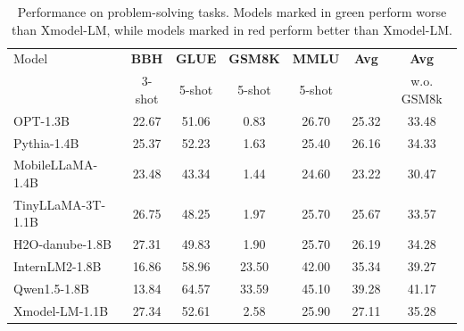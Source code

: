 \documentclass{article}
\newcommand{\llm}{Xmodel-LM\xspace}
\begin{document}
\begin{table}[ht]
  \centering
  \setlength{\tabcolsep}{8pt}
  \begin{tabular}{lcccccc}
    \toprule
    Model & \textbf{BBH} & \textbf{GLUE} & \textbf{GSM8K} & \textbf{MMLU} & \textbf{Avg} & \textbf{Avg}\\
    & 3-shot& 5-shot& 5-shot& 5-shot&&w.o. GSM8k \\
    \midrule
    \rowcolor{darkgreen!20}
    OPT-1.3B\xspace   &22.67&51.06&0.83&26.70&25.32&33.48 \\
    \rowcolor{darkgreen!20}
    Pythia-1.4B\xspace   &25.37&52.23&1.63&25.40&26.16&34.33 \\
    \rowcolor{darkgreen!20}
    MobileLLaMA-1.4B\xspace   &23.48&43.34&1.44&24.60&23.22&30.47 \\
    \rowcolor{darkgreen!20}
    TinyLLaMA-3T-1.1B\xspace   &26.75&48.25&1.97&25.70&25.67&33.57 \\
    \rowcolor{darkgreen!20}
    H2O-danube-1.8B\xspace  &27.31&49.83&1.90&25.70&26.19&34.28 \\
    \rowcolor{darkred!20}
    InternLM2-1.8B\xspace  &16.86&58.96&23.50&42.00&35.34&39.27 \\
    \rowcolor{darkred!20}
    Qwen1.5-1.8B\xspace &13.84&64.57&33.59&45.10&39.28&41.17 \\
    \midrule
    \rowcolor{xdcolor!20}
    \llm-1.1B\xspace    &27.34&52.61&2.58&25.90&27.11&35.28 \\
    \bottomrule
  \end{tabular}
  \newline
  \caption{Performance on problem-solving tasks. Models marked in green perform worse than \llm, while models marked in red perform better than \llm.}
  \label{tab: problem-solving}
\end{table}
\end{document}
